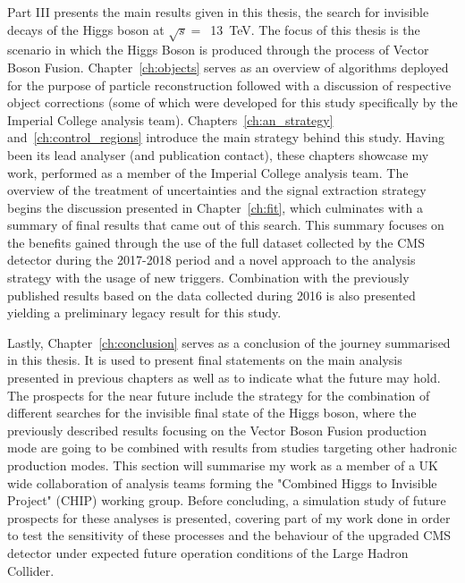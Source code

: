 \hspace{10pt} Part III presents the main results given in this thesis, the search for invisible decays of the Higgs boson at $\sqrt{s}=$~13~TeV. The focus of this thesis is the scenario in which the Higgs Boson is produced through the process of Vector Boson Fusion. Chapter~\ref{ch:objects} serves as an overview of algorithms deployed for the purpose of particle reconstruction followed with a discussion of respective object corrections (some of which were developed for this study specifically by the Imperial College analysis team). Chapters~\ref{ch:an_strategy} and~\ref{ch:control_regions} introduce the main strategy behind this study. Having been its lead analyser (and publication contact), these chapters showcase my work, performed as a member of the Imperial College analysis team. The overview of the treatment of uncertainties and the signal extraction strategy begins the discussion presented in Chapter~\ref{ch:fit}, which culminates with a summary of final results that came out of this search. This summary focuses on the benefits gained through the use of the full dataset collected by the CMS detector during the 2017-2018 period and a novel approach to the analysis strategy with the usage of new triggers. Combination with the previously published results based on the data collected during 2016 is also presented yielding a preliminary legacy result for this study.

\hspace{10pt} Lastly, Chapter~\ref{ch:conclusion} serves as a conclusion of the journey summarised in this thesis. It is used to present final statements on the main analysis presented in previous chapters as well as to indicate what the future may hold. The prospects for the near future include the strategy for the combination of different searches for the invisible final state of the Higgs boson, where the previously described results focusing on the Vector Boson Fusion production mode are going to be combined with results from studies targeting other hadronic production modes. This section will summarise my work as a member of a UK wide collaboration of analysis teams forming the "Combined Higgs to Invisible Project" (CHIP) working group. Before concluding, a simulation study of future prospects for these analyses is presented, covering part of my work done in order to test the sensitivity of these processes and the behaviour of the upgraded CMS detector under expected future operation conditions of the Large Hadron Collider.

\begin{center}
    \expandafter\pgfornament\expandafter{88}
\end{center}
\restoregeometry



